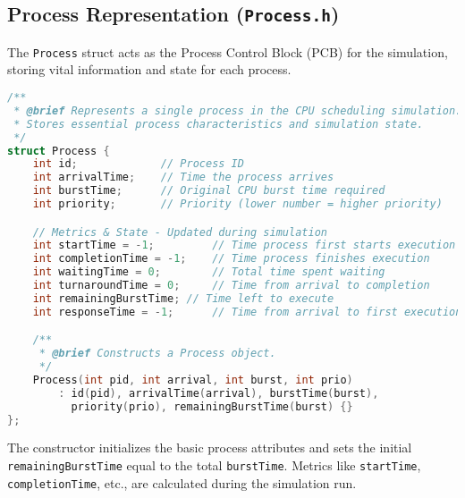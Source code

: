 \documentclass[12pt]{article}
\begin{document}
\subsection{Process Representation (\texttt{Process.h})}
The \texttt{Process} struct acts as the Process Control Block (PCB) for the simulation, storing vital information and state for each process.
\begin{lstlisting}[language=C++, caption={Process Struct Definition (Process.h)}, label={lst:process_struct}, style=cppstyle]
/**
 * @brief Represents a single process in the CPU scheduling simulation.
 * Stores essential process characteristics and simulation state.
 */
struct Process {
    int id;             // Process ID
    int arrivalTime;    // Time the process arrives
    int burstTime;      // Original CPU burst time required
    int priority;       // Priority (lower number = higher priority)

    // Metrics & State - Updated during simulation
    int startTime = -1;         // Time process first starts execution
    int completionTime = -1;    // Time process finishes execution
    int waitingTime = 0;        // Total time spent waiting
    int turnaroundTime = 0;     // Time from arrival to completion
    int remainingBurstTime; // Time left to execute
    int responseTime = -1;      // Time from arrival to first execution

    /**
     * @brief Constructs a Process object.
     */
    Process(int pid, int arrival, int burst, int prio)
        : id(pid), arrivalTime(arrival), burstTime(burst), 
          priority(prio), remainingBurstTime(burst) {}
};
\end{lstlisting}
The constructor initializes the basic process attributes and sets the initial \texttt{remainingBurstTime} equal to the total \texttt{burstTime}. Metrics like \texttt{startTime}, \texttt{completionTime}, etc., are calculated during the simulation run.
\end{document}
